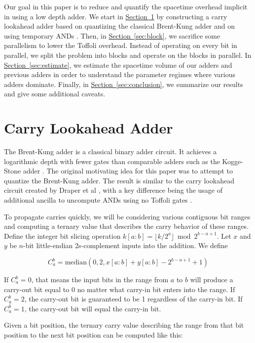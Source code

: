 \documentclass[onecolumn,unpublished]{quantumarticle}
\theoremstyle{definition}
\theoremstyle{definition}
\theoremstyle{definition}
\renewcommand{\sec}[1]{\hyperref[sec:#1]{Section~\ref*{sec:#1}}}
\begin{document}
Our goal in this paper is to reduce and quantify the spacetime overhead implicit in using a low depth adder.
We start in \sec{lookahead} by constructing a carry lookahead adder based on quantizing the classical Brent-Kung adder \cite{brent1982adder} and on using temporary ANDs \cite{gidney2018halving}.
Then, in \sec{block}, we sacrifice some parallelism to lower the Toffoli overhead.
Instead of operating on every bit in parallel, we split the problem into blocks and operate on the blocks in parallel.
In \sec{estimate}, we estimate the spacetime volume of our adders and previous adders in order to understand the parameter regimes where various adders dominate.
Finally, in \sec{conclusion}, we summarize our results and give some additional caveats.


\section{Carry Lookahead Adder}
\label{sec:lookahead}

The Brent-Kung adder \cite{brent1982adder} is a classical binary adder circuit.
It achieves a logarithmic depth with fewer gates than comparable adders such as the Kogge-Stone adder \cite{kogge1973adder}.
The original motivating idea for this paper was to attempt to quantize the Brent-Kung adder.
The result is similar to the carry lookahead circuit created by Draper et al \cite{draper2004lookaheadadder}, with a key difference being the usage of additional ancilla to uncompute ANDs using no Toffoli gates \cite{gidney2018halving}.

To propagate carries quickly, we will be considering various contiguous bit ranges and computing a ternary value that describes the carry behavior of these ranges.
Define the integer bit slicing operation $k[a:b] = \lfloor k/2^a \rfloor \bmod 2^{b-a+1}$.
Let $x$ and $y$ be $n$-bit little-endian 2s-complement inputs into the addition.
We define

$$C_a^b = \text{median}(0, 2, x[a:b] + y[a:b] - 2^{b - a + 1} + 1)$$

If $C_a^b = 0$, that means the input bits in the range from $a$ to $b$ will produce a carry-out bit equal to 0 no matter what carry-in bit enters into the range.
If $C_a^b = 2$, the carry-out bit is guaranteed to be 1 regardless of the carry-in bit.
If $C_a^b = 1$, the carry-out bit will equal the carry-in bit.

Given a bit position, the ternary carry value describing the range from that bit position to the next bit position can be computed like this:
\end{document}
